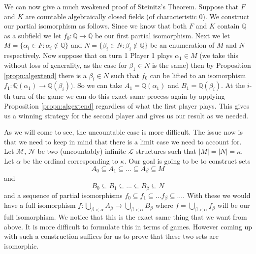 \begin{ex}
We can now give a much weakened proof of Steinitz's Theorem. Suppose that $F$ 
and $K$ are countable algebraically closed fields (of characteristic 0). 
We construct our partial isomorphism as follows. Since we know that both $F$ 
and $K$ contain $\mathbb{Q}$ as a subfield we let $f_{0}: \mathbb{Q} \to
\mathbb{Q}$ be our first partial isomorphism. Next we let $M = \{\alpha_{i}
\in F: \alpha_{i} \not\in \mathbb{Q}\}$ and $N = \{\beta_{i} \in N: \beta_{i}
\not\in \mathbb{Q}\}$ be an enumeration of $M$ and $N$ respectively. 
Now suppose that on turn 1 Player 1 plays $\alpha_{1} \in M$ (we take this
without loss of generality, as the case for $\beta_{1} \in N$ is the same)
then by Proposition \ref{propn:algextend} there is a $\beta_{i} \in N$ such that
$f_{0}$ can be lifted to an isomorphism $f_{1}: \mathbb{Q}(\alpha_{1}) \to
\mathbb{Q}(\beta_{i}))$. So we can take $A_{1} = \mathbb{Q}(\alpha_{1})$ and
$B_{1} = \mathbb{Q}(\beta_{i})$. At the $i$-th turn of the game we can do this
exact same process again by applying Proposition \ref{propn:algextend}
regardless of what the first player plays. This gives us a winning strategy for
the second player and gives us our result as we needed.\\ 

\end{ex}

As we will come to see, the uncountable case is more difficult. The issue now
is that we need to keep in mind that there is a limit case we need to account
for. Let  $\mathcal{M}$, $\mathcal{N}$ be two (uncountably) infinite
$\mathcal{L}$ structures such that $|M| = |N| = \kappa$. Let $\alpha$ be the
ordinal corresponding to $\kappa$. Our goal is going to be to construct sets
\[
  A_0 \subseteq A_1 \subseteq \ldots \subseteq A_{\beta} \subseteq M
\] 
and
\[
B_0 \subseteq B_1 \subseteq \ldots \subseteq B_{\beta} \subseteq N
\] 
and a sequence of partial isomorphisms $f_0 \subseteq f_1 \subseteq \ldots
f_{\beta} \subseteq \ldots$. With these we would have a full isomorphism  $f:
\bigcup_{\beta < \alpha} A_{\beta} \to \bigcup_{\beta < \alpha} B_{\beta}$ 
where $f = \bigcup_{\beta < \alpha} f_{\beta}$ will be our full isomorphism. We
notice that this is the exact same thing that we want from above. It is more
difficult to formulate this in terms of games. However coming up with such
a construction suffices for us to prove that these two sets are isomorphic.


